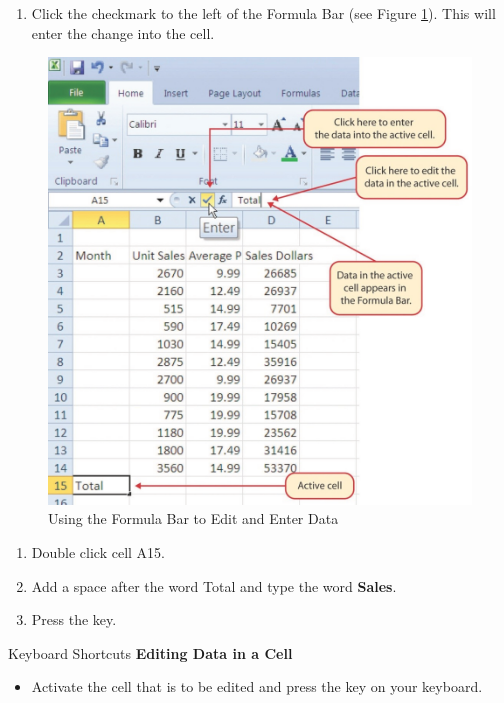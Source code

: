 \begin{enumerate}[resume]
	\item Click the checkmark to the left of the Formula Bar (see Figure \ref{01:fig17}). This will enter the change into the cell.
\end{enumerate}

\begin{figure}[H]
	\centering
	\includegraphics[width=\maxwidth{.95\linewidth}]{gfx/ch01_fig17}
	\caption{Using the Formula Bar to Edit and Enter Data}
	\label{01:fig17}
\end{figure}

\begin{enumerate}[resume]
	\item Double click cell \textsf{A15}.
	\item Add a space after the word Total and type the word \textbf{Sales}.
	\item Press the  key.
\end{enumerate}

\begin{center}
	\begin{shtcutbox}{Keyboard Shortcuts}
		\textbf{Editing Data in a Cell}
		\\
		\begin{itemize}
			\setlength{\itemsep}{0pt}
			\setlength{\parskip}{0pt}
			\setlength{\parsep}{0pt}
			
			\item Activate the cell that is to be edited and press the  key on your keyboard.
			
		\end{itemize}
	\end{shtcutbox}
\end{center}

